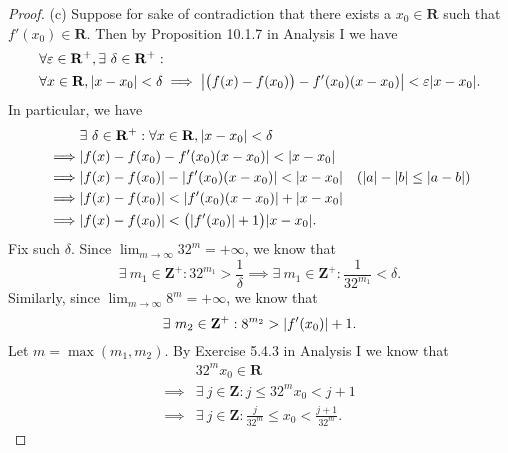 \begin{proof}{(c)}
    Suppose for sake of contradiction that there exists a \(x_0 \in \mathbf{R}\) such that \(f'(x_0) \in \mathbf{R}\).
    Then by Proposition 10.1.7 in Analysis I we have
    \begin{align*}
         & \forall \varepsilon \in \mathbf{R}^+, \exists\ \delta \in \mathbf{R}^+ :                                                                    \\
         & \forall x \in \mathbf{R}, \abs*{x - x_0} < \delta \implies \abs*{\big(f(x) - f(x_0)\big) - f'(x_0) (x - x_0)} < \varepsilon \abs*{x - x_0}.
    \end{align*}
    In particular, we have
    \begin{align*}
                 & \exists\ \delta \in \mathbf{R}^+ : \forall x \in \mathbf{R}, \abs*{x - x_0} < \delta                                           \\
        \implies & \abs*{f(x) - f(x_0) - f'(x_0) (x - x_0)} < \abs*{x - x_0}                                                                      \\
        \implies & \abs*{f(x) - f(x_0)} - \abs*{f'(x_0) (x - x_0)} < \abs*{x - x_0}                     & (\abs*{a} - \abs*{b} \leq \abs*{a - b}) \\
        \implies & \abs*{f(x) - f(x_0)} < \abs*{f'(x_0) (x - x_0)} + \abs*{x - x_0}                                                               \\
        \implies & \abs*{f(x) - f(x_0)} < \big(\abs*{f'(x_0)} + 1\big) \abs*{x - x_0}.
    \end{align*}
    Fix such \(\delta\).
    Since \(\lim_{m \to \infty} 32^m = +\infty\), we know that
    \[
        \exists\ m_1 \in \mathbf{Z}^+ : 32^{m_1} > \frac{1}{\delta} \implies \exists\ m_1 \in \mathbf{Z}^+ : \frac{1}{32^{m_1}} < \delta.
    \]
    Similarly, since \(\lim_{m \to \infty} 8^m = +\infty\), we know that
    \[
        \exists\ m_2 \in \mathbf{Z}^+ : 8^{m_2} > \abs*{f'(x_0)} + 1.
    \]
    Let \(m = \max(m_1, m_2)\).
    By Exercise 5.4.3 in Analysis I we know that
    \begin{align*}
                 & 32^m x_0 \in \mathbf{R}                                                   \\
        \implies & \exists\ j \in \mathbf{Z} : j \leq 32^m x_0 < j + 1                       \\
        \implies & \exists\ j \in \mathbf{Z} : \frac{j}{32^m} \leq x_0 < \frac{j + 1}{32^m}.
    \end{align*}

\end{proof}
